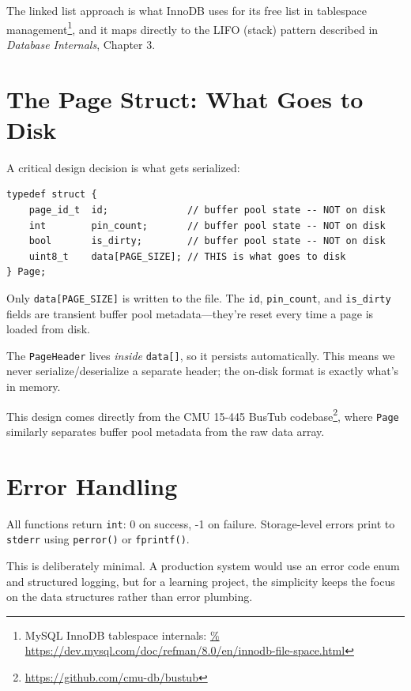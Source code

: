 \documentclass[12pt, a4paper]{report}
\begin{document}
The linked list approach is what InnoDB uses for its free list in tablespace
management\footnote{MySQL InnoDB tablespace internals: \url{%
https://dev.mysql.com/doc/refman/8.0/en/innodb-file-space.html}}, and it maps
directly to the LIFO (stack) pattern described in \textit{Database Internals},
Chapter 3.


\section{The Page Struct: What Goes to Disk}

A critical design decision is what gets serialized:

\begin{lstlisting}
typedef struct {
    page_id_t  id;              // buffer pool state -- NOT on disk
    int        pin_count;       // buffer pool state -- NOT on disk
    bool       is_dirty;        // buffer pool state -- NOT on disk
    uint8_t    data[PAGE_SIZE]; // THIS is what goes to disk
} Page;
\end{lstlisting}

Only \texttt{data[PAGE\_SIZE]} is written to the file. The \texttt{id},
\texttt{pin\_count}, and \texttt{is\_dirty} fields are transient buffer pool
metadata---they're reset every time a page is loaded from disk.

The \texttt{PageHeader} lives \textit{inside} \texttt{data[]}, so it persists
automatically. This means we never serialize/deserialize a separate header;
the on-disk format is exactly what's in memory.

This design comes directly from the CMU 15-445 BusTub
codebase\footnote{\url{https://github.com/cmu-db/bustub}}, where
\texttt{Page} similarly separates buffer pool metadata from the raw data
array.


\section{Error Handling}

All functions return \texttt{int}: 0 on success, -1 on failure.
Storage-level errors print to \texttt{stderr} using \texttt{perror()} or
\texttt{fprintf()}.

This is deliberately minimal. A production system would use an error code
enum and structured logging, but for a learning project, the simplicity
keeps the focus on the data structures rather than error plumbing.
\end{document}
